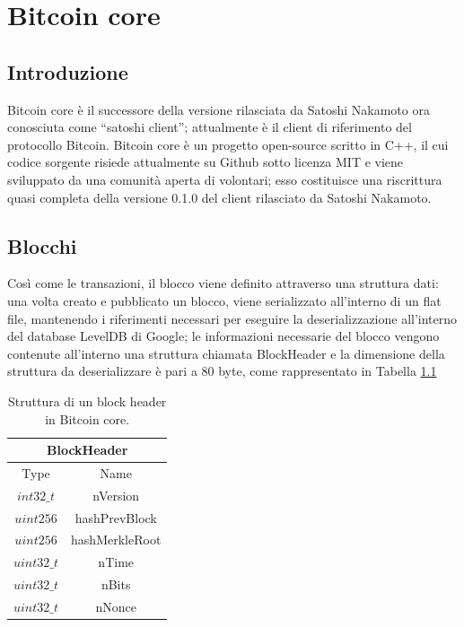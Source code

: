 \chapter{Bitcoin core}
\label{chap:bitcoin core}

\section{Introduzione}\label{sec:introduzionebitcoincore}

Bitcoin core è il successore della versione rilasciata da Satoshi Nakamoto ora conosciuta come “satoshi client”; attualmente è il client di riferimento del protocollo Bitcoin.
Bitcoin core è un progetto open-source scritto in C++, il cui codice sorgente risiede attualmente su Github sotto licenza MIT e viene sviluppato da una comunità aperta di volontari; esso costituisce una riscrittura quasi completa della versione 0.1.0 del client rilasciato da Satoshi Nakamoto.

\section{Blocchi}
\label{sec:blocchibitcoincore}

Così come le transazioni, il blocco viene definito attraverso una struttura dati: una volta creato e pubblicato un blocco, viene serializzato all’interno di un flat file, mantenendo i riferimenti necessari per eseguire la deserializzazione all’interno del database LevelDB di Google; le informazioni necessarie del blocco vengono contenute all’interno una struttura chiamata BlockHeader e la dimensione della struttura da deserializzare è pari a 80 byte, come rappresentato in Tabella \ref{tab:blockheaderbitcoinc}

\begin{table}
       \centering\small
           \begin{tabular}{|c|c|}
               \hline
                 \multicolumn{2}{|c|}{\textbf{BlockHeader}} \\
                 \hline
                 \multicolumn{1}{|c|}{Type} & \multicolumn{1}{c|}{Name} \\
               \hline \hline
               $int32\_t$ & nVersion   \\
               \hline
               $uint256$ & hashPrevBlock \\
                \hline
               $uint256$ & hashMerkleRoot \\
                \hline
               $uint32\_t$ & nTime \\
                \hline
               $uint32\_t$ & nBits \\
                \hline
               $uint32\_t$ & nNonce \\
               \hline
       \end{tabular}
       \caption{Struttura di un block header in Bitcoin core.\label{tab:blockheaderbitcoinc}}
   \end{table}


